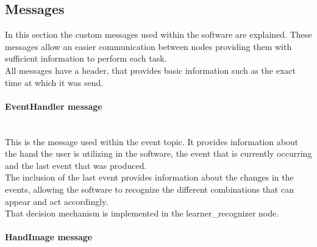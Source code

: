 \subsection{Messages}
\label{messages}

	In this section the custom messages used within the software are explained. These messages allow an easier communication between nodes providing them with sufficient information to perform each task. 
	\\

	All messages have a header, that provides basic information such as the exact time at which it was send. 


	\paragraph{EventHandler message}\mbox{} \\



		This is the message used within the event topic. It provides information about the hand the user is utilizing in the software, the event that is currently occurring and the last event that was produced. 
		\\

		The inclusion of the last event provides information about the changes in the events, allowing the software to recognize the different combinations that can appear and act accordingly. 
		\\

		That decision mechanism is implemented in the learner\_recognizer node. 

	\paragraph{HandImage message}\mbox{} \\


